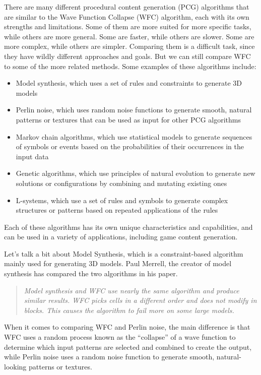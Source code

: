 \documentclass[10pt,oneside,a4paper]{article}
\begin{document}
There are many different procedural content generation (PCG) algorithms that are similar to the Wave Function Collapse (WFC) algorithm, each with its own strengths and limitations.
Some of them are more suited for more specific tasks, while others are more general.
Some are faster, while others are slower. Some are more complex, while others are simpler.
Comparing them is a difficult task, since they have wildly different approaches and goals.
But we can still compare WFC to some of the more related methods.
Some examples of these algorithms include:
\begin{itemize}
    \item Model synthesis, which uses a set of rules and constraints to generate 3D models
    \item Perlin noise, which uses random noise functions to generate smooth, natural patterns or textures that can be used as input for other PCG algorithms
    \item Markov chain algorithms, which use statistical models to generate sequences of symbols or events based on the probabilities of their occurrences in the input data
    \item Genetic algorithms, which use principles of natural evolution to generate new solutions or configurations by combining and mutating existing ones
    \item L-systems, which use a set of rules and symbols to generate complex structures or patterns based on repeated applications of the rules
\end{itemize}
Each of these algorithms has its own unique characteristics and capabilities, and can be used in a variety of applications, including game content generation.

Let's talk a bit about Model Synthesis, which is a constraint-based algorithm mainly used for generating 3D models.
Paul Merrell, the creator of model synthesis has compared the two algorithms in his paper\cite{Mer21}.
\begin{quote}
    \textit{Model synthesis and WFC use nearly the same algorithm and produce similar results. WFC picks cells in a different
order and does not modify in blocks. This causes the algorithm to fail more on some large models.}
\end{quote}

When it comes to comparing WFC and Perlin noise, the main difference is that WFC uses a random process known as the ``collapse'' of a wave function to determine which input patterns are selected and combined to create the output, while Perlin noise uses a random noise function to generate smooth, natural-looking patterns or textures.
\end{document}
